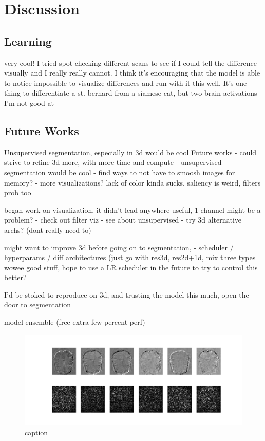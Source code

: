 \section{Discussion}\label{sec:discussion}

\subsection{Learning}\label{subsec:learning}
very cool! I tried spot checking different scans to see if I could tell the difference visually and I really really
cannot. I think it's encouraging that the model is able to notice impossible to visualize differences and run with it
this well. It's one thing to differentiate a st. bernard from a siamese cat, but two brain activations I'm not good at

\subsection{Future Works}\label{subsec:future-works}
Unsupervised segmentation, especially in 3d would be cool
Future works
- could strive to refine 3d more, with more time and compute
- unsupervised segmentation would be cool
- find ways to not have to smoosh images for memory?
- more visualizations? lack of color kinda sucks, saliency is weird, filters prob too

began work on visualization, it didn't lead anywhere useful, 1 channel might be a problem?
- check out filter viz
- see about unsupervised
- try 3d alternative archs? (dont really need to)

might want to improve 3d before going on to segmentation,
- scheduler / hyperparams / diff architectures (just go with res3d, res2d+1d, mix three types
wowee good stuff, hope to use a LR scheduler in the future to try to control this better?


 I'd be stoked
to reproduce on 3d, and trusting the model this much, open the door to segmentation

model ensemble (free extra few percent perf)
 \begin{figure}
  \includegraphics[width=\linewidth]{images/saliency.png}
  \caption{caption}
  \label{fig:saliency}
\end{figure}
